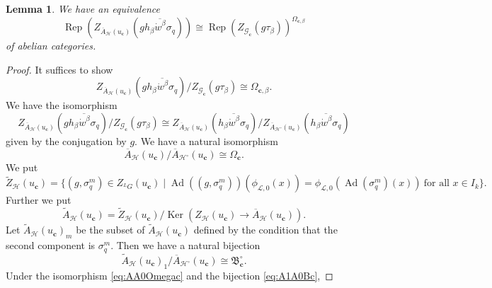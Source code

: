 \documentclass[12pt,a4paper]{article}
\newtheorem{lem}[thm]{Lemma}
\DeclareMathOperator{\Rep}{Rep}
\DeclareMathOperator{\Ker}{Ker}
\DeclareMathOperator{\Ad}{Ad}
\newcommand{\mc}{\mathcal}
\newcommand{\mf}{\mathfrak}
\newcommand{\mbf}{\mathbf}
\newcommand{\ol}{\overline}
\begin{document}
\begin{lem}\label{lem:ZquotOmega}
We have an equivalence  
\begin{equation}\label{eq:ZOmega}
	\Rep (Z_{\ol{A}_{\mc{H}}(u_{\mbf{c}})}(g \ol{h_{\beta} \dot{w}^{\beta} \sigma_q})) \cong \Rep (Z_{\mc{G}_{\mbf{c}}}(g \tau_{\beta}))^{\Omega_{\mbf{c},\beta}} 
\end{equation}
of abelian categories. 
\end{lem}
\begin{proof}
It suffices to show 
\begin{equation*}
	Z_{\ol{A}_{\mc{H}}(u_{\mbf{c}})}(g \ol{h_{\beta} \dot{w}^{\beta} \sigma_q})/ 
	Z_{\mc{G}_{\mbf{c}}}(g \tau_{\beta}) 
	\cong \Omega_{\mbf{c},\beta}. 
\end{equation*}	
We have the isomorphism 
\begin{equation}\label{eq:centconjg}
	Z_{\ol{A}_{\mc{H}}(u_{\mbf{c}})}(g \ol{h_{\beta} \dot{w}^{\beta} \sigma_q})/ 
	Z_{\mc{G}_{\mbf{c}}}(g \tau_{\beta}) 
	\cong Z_{\ol{A}_{\mc{H}}(u_{\mbf{c}})}(\ol{h_{\beta} \dot{w}^{\beta} \sigma_q})/ 
	Z_{\ol{A}_{\mc{H}^{\circ}}(u_{\mbf{c}})}(\ol{h_{\beta} \dot{w}^{\beta} \sigma_q}) 
\end{equation}
given by the conjugation by $g$. 
We have a natural isomorphism 
\begin{equation}\label{eq:AA0Omegac}
	\ol{A}_{\mc{H}}(u_{\mbf{c}}) / \ol{A}_{\mc{H}^{\circ}}(u_{\mbf{c}}) \cong \Omega_{\mbf{c}}. 
\end{equation}
We put 
\begin{equation}
	\widetilde{Z}_{\mc{H}}(u_{\mbf{c}})=\{ (g,\sigma_q^m) \in Z_{{}^{L}G}(u_{\mbf{c}}) \mid 
	\Ad ((g,\sigma_q^m))(\phi_{\mc{L},0} (x))=\phi_{\mc{L},0} (\Ad (\sigma_q^m)(x)) \ \textrm{for all $x \in I_k$}
	\}. 
\end{equation}
Further we put 
\begin{equation}
	\widetilde{A}_{\mc{H}}(u_{\mbf{c}})=\widetilde{Z}_{\mc{H}}(u_{\mbf{c}}) / 
	\Ker (Z_{\mc{H}}(u_{\mbf{c}}) \to \ol{A}_{\mc{H}}(u_{\mbf{c}})). 
\end{equation}
Let $\widetilde{A}_{\mc{H}}(u_{\mbf{c}})_m$ be the subset of $\widetilde{A}_{\mc{H}}(u_{\mbf{c}})$ defined by the condition that the second component is $\sigma_q^m$. 
Then we have a natural bijection 
\begin{equation}\label{eq:A1A0Bc}
	\widetilde{A}_{\mc{H}}(u_{\mbf{c}})_1 / \ol{A}_{\mc{H}^{\circ}}(u_{\mbf{c}}) 
	\cong \mf{B}_{\mbf{c}}^{\circ}.  
\end{equation}
Under the isomorphism \eqref{eq:AA0Omegac} and the bijection \eqref{eq:A1A0Bc},  

\end{proof}
\end{document}

